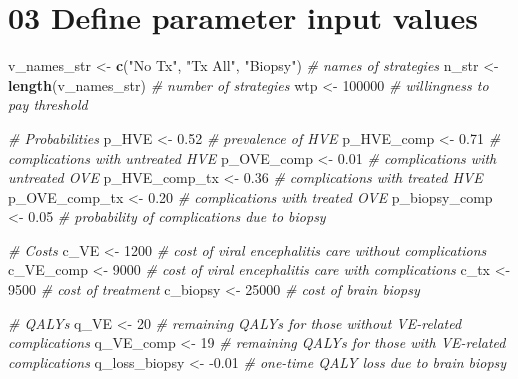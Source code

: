 \documentclass[
]{article}
\newenvironment{Shaded}{\begin{snugshade}}{\end{snugshade}}
\newcommand{\CommentTok}[1]{\textcolor[rgb]{0.56,0.35,0.01}{\textit{#1}}}
\newcommand{\DecValTok}[1]{\textcolor[rgb]{0.00,0.00,0.81}{#1}}
\newcommand{\FloatTok}[1]{\textcolor[rgb]{0.00,0.00,0.81}{#1}}
\newcommand{\KeywordTok}[1]{\textcolor[rgb]{0.13,0.29,0.53}{\textbf{#1}}}
\newcommand{\NormalTok}[1]{#1}
\newcommand{\StringTok}[1]{\textcolor[rgb]{0.31,0.60,0.02}{#1}}
\begin{document}
\hypertarget{define-parameter-input-values}{%
\section{03 Define parameter input
values}\label{define-parameter-input-values}}

\begin{Shaded}
\begin{Highlighting}[]
\NormalTok{v_names_str <-}\StringTok{ }\KeywordTok{c}\NormalTok{(}\StringTok{"No Tx"}\NormalTok{, }\StringTok{"Tx All"}\NormalTok{, }\StringTok{"Biopsy"}\NormalTok{) }\CommentTok{# names of strategies}
\NormalTok{n_str       <-}\StringTok{ }\KeywordTok{length}\NormalTok{(v_names_str)            }\CommentTok{# number of strategies}
\NormalTok{wtp         <-}\StringTok{ }\DecValTok{100000}                         \CommentTok{# willingness to pay threshold}

\CommentTok{# Probabilities}
\NormalTok{p_HVE         <-}\StringTok{ }\FloatTok{0.52} \CommentTok{# prevalence of HVE}
\NormalTok{p_HVE_comp    <-}\StringTok{ }\FloatTok{0.71} \CommentTok{# complications with untreated HVE}
\NormalTok{p_OVE_comp    <-}\StringTok{ }\FloatTok{0.01} \CommentTok{# complications with untreated OVE}
\NormalTok{p_HVE_comp_tx <-}\StringTok{ }\FloatTok{0.36} \CommentTok{# complications with treated HVE}
\NormalTok{p_OVE_comp_tx <-}\StringTok{ }\FloatTok{0.20} \CommentTok{# complications with treated OVE}
\NormalTok{p_biopsy_comp <-}\StringTok{ }\FloatTok{0.05} \CommentTok{# probability of complications due to biopsy}

\CommentTok{# Costs}
\NormalTok{c_VE      <-}\StringTok{ }\DecValTok{1200}  \CommentTok{# cost of viral encephalitis care without complications}
\NormalTok{c_VE_comp <-}\StringTok{ }\DecValTok{9000}  \CommentTok{# cost of viral encephalitis care with complications}
\NormalTok{c_tx      <-}\StringTok{ }\DecValTok{9500}  \CommentTok{# cost of treatment}
\NormalTok{c_biopsy  <-}\StringTok{ }\DecValTok{25000} \CommentTok{# cost of brain biopsy}

\CommentTok{# QALYs}
\NormalTok{q_VE          <-}\StringTok{ }\DecValTok{20}    \CommentTok{# remaining QALYs for those without VE-related complications}
\NormalTok{q_VE_comp     <-}\StringTok{ }\DecValTok{19}    \CommentTok{# remaining QALYs for those with VE-related complications}
\NormalTok{q_loss_biopsy <-}\StringTok{ }\FloatTok{-0.01} \CommentTok{# one-time QALY loss due to brain biopsy}


\end{Highlighting}
\end{Shaded}
\end{document}
